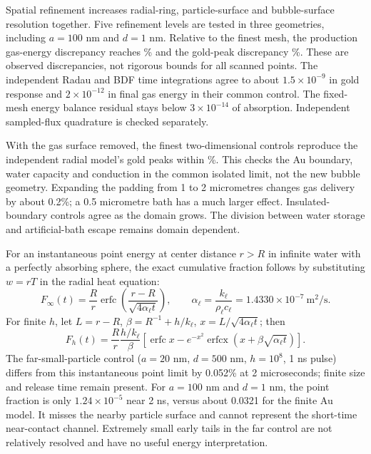 \documentclass[10pt,a4paper]{article}
\begin{document}
Spatial refinement increases radial-ring, particle-surface and bubble-surface resolution together. Five refinement levels are tested in three geometries, including $a=100$ nm and $d=1$ nm. Relative to the finest mesh, the production gas-energy discrepancy reaches \MeshGasPercent\% and the gold-peak discrepancy \MeshGoldPercent\%. These are observed discrepancies, not rigorous bounds for all scanned points. The independent Radau and BDF time integrations agree to about $1.5\times10^{-9}$ in gold response and $2\times10^{-12}$ in final gas energy in their common control. The fixed-mesh energy balance residual stays below $3\times10^{-14}$ of absorption. Independent sampled-flux quadrature is checked separately.

With the gas surface removed, the finest two-dimensional controls reproduce the independent radial model's gold peaks within \IsolatedPercent\%. This checks the Au boundary, water capacity and conduction in the common isolated limit, not the new bubble geometry. Expanding the padding from 1 to 2 micrometres changes gas delivery by about 0.2\%; a 0.5 micrometre bath has a much larger effect. Insulated-boundary controls agree as the domain grows. The division between water storage and artificial-bath escape remains domain dependent.

For an instantaneous point energy at center distance $r>R$ in infinite water with a perfectly absorbing sphere, the exact cumulative fraction follows by substituting $w=rT$ in the radial heat equation:
\begin{equation}
 F_{\infty}(t)=\frac Rr\operatorname{erfc}\!\left(\frac{r-R}{\sqrt{4\alpha_\ell t}}\right),
 \qquad \alpha_\ell=\frac{k_\ell}{\rho_\ell c_\ell}=1.4330\times10^{-7}\ \mathrm{m^2/s}.
\end{equation}
For finite $h$, let $L=r-R$, $\beta=R^{-1}+h/k_\ell$, $x=L/\sqrt{4\alpha_\ell t}$; then
\begin{equation}
 F_h(t)=\frac Rr\frac{h/k_\ell}{\beta}
 \left[\operatorname{erfc}x-e^{-x^2}\operatorname{erfcx}(x+\beta\sqrt{\alpha_\ell t})\right].\label{eq:robin}
\end{equation}
The far-small-particle control ($a=20$ nm, $d=500$ nm, $h=10^8$, 1 ns pulse) differs from this instantaneous point limit by 0.052\% at 2 microseconds; finite size and release time remain present. For $a=100$ nm and $d=1$ nm, the point fraction is only $1.24\times10^{-5}$ near 2 ns, versus about 0.0321 for the finite Au model. It misses the nearby particle surface and cannot represent the short-time near-contact channel. Extremely small early tails in the far control are not relatively resolved and have no useful energy interpretation.
\newpage
\end{document}
